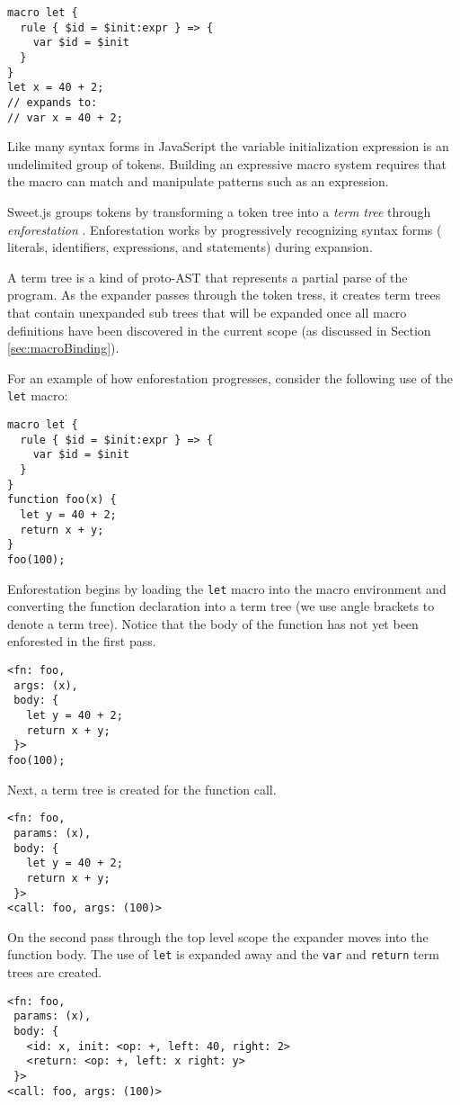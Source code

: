 \documentclass[preprint,10pt]{sigplanconf}
\begin{document}
\begin{lstlisting}
macro let {
  rule { $id = $init:expr } => {
    var $id = $init
  }
}
let x = 40 + 2;
// expands to:
// var x = 40 + 2;
\end{lstlisting}

Like many syntax forms in JavaScript the variable initialization
expression is an undelimited group of tokens. Building an expressive
macro system requires that the macro can match and manipulate patterns
such as an expression.

Sweet.js groups tokens by
transforming a token tree into a
\emph{term tree} through \emph{enforestation} \cite{Rafkind2013}.
Enforestation works by progressively recognizing syntax forms (\eg
literals, identifiers, expressions, and statements) during expansion.

A term tree is a kind of proto-AST that represents a partial parse of
the program. As the expander passes through the token tress, it
creates term trees that contain unexpanded sub trees that will be
expanded once all macro definitions have been discovered in the
current scope (as discussed in Section \ref{sec:macroBinding}).

For an example of how enforestation progresses, consider the following
use of the \lstinline!let! macro:
\begin{lstlisting}
macro let {
  rule { $id = $init:expr } => {
    var $id = $init
  }
}
function foo(x) {
  let y = 40 + 2;
  return x + y;
}
foo(100);
\end{lstlisting}
Enforestation begins by loading the \lstinline!let! macro into the
macro environment and converting the function declaration into a term
tree (we use angle brackets to denote a term tree). Notice that the
body of the function has not yet been enforested in the first pass.
\begin{lstlisting}
<fn: foo, 
 args: (x), 
 body: {
   let y = 40 + 2;
   return x + y;
 }>
foo(100);
\end{lstlisting}
Next, a term tree is created for the function call.
\begin{lstlisting}
<fn: foo, 
 params: (x), 
 body: {
   let y = 40 + 2;
   return x + y;
 }>
<call: foo, args: (100)>
\end{lstlisting}
On the second pass through the top level scope the expander moves into
the function body. The use of \lstinline!let! is expanded away and the
\lstinline!var! and \lstinline!return! term trees are created.
\begin{lstlisting}
<fn: foo, 
 params: (x), 
 body: {
   <id: x, init: <op: +, left: 40, right: 2>
   <return: <op: +, left: x right: y> 
 }>
<call: foo, args: (100)>
\end{lstlisting}
\end{document}
